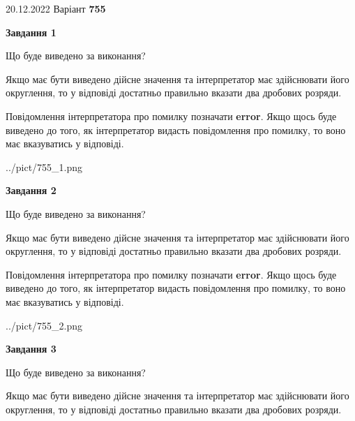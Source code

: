 \documentclass[12pt, ukrainian]{article}
\begin{document}
{20.12.2022 Варіант \No \textbf { 755 }\par}
{
\begin {Large}

{\begin {center}\textbf{Завдання 1}\end {center}}\par
Що буде виведено за виконання? \par

Якщо має бути виведено дійсне значення та інтерпретатор має здійснювати його округлення, 
то у відповіді достатньо правильно вказати два дробових розряди.

Повідомлення інтерпретатора про помилку позначати \textbf{error}.
Якщо щось буде виведено до того, як інтерпретатор видасть повідомлення про помилку, 
то воно має вказуватись у відповіді. \par

\begin{center}
	{../pict/755_1.png}
\end{center}
\newpage

{\begin {center}\textbf{Завдання 2}\end {center}}\par
Що буде виведено за виконання? \par

Якщо має бути виведено дійсне значення та інтерпретатор має здійснювати його округлення, 
то у відповіді достатньо правильно вказати два дробових розряди.

Повідомлення інтерпретатора про помилку позначати \textbf{error}.
Якщо щось буде виведено до того, як інтерпретатор видасть повідомлення про помилку, 
то воно має вказуватись у відповіді. \par

\begin{center}
	{../pict/755_2.png}
\end{center}
\newpage

{\begin {center}\textbf{Завдання 3}\end {center}}\par
Що буде виведено за виконання? \par

Якщо має бути виведено дійсне значення та інтерпретатор має здійснювати його округлення, 
то у відповіді достатньо правильно вказати два дробових розряди.


\end{Large}}
\end{document}
